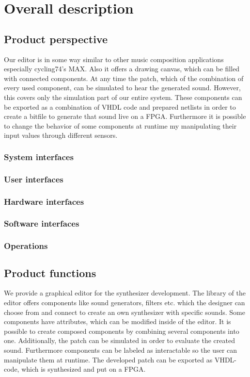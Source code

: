 \chapter{Overall description}
	\section{Product perspective}
	Our editor is in some way similar to other music composition applications especially cycling74's MAX. Also it offers a drawing canvas, which can be filled with connected components. At any time the patch, which of the combination of every used component, can be simulated to hear the generated sound. However, this covers only the simulation part of our entire system. These components can be exported as a combination of VHDL code and prepared netlists in order to create a bitfile to generate that sound live on a FPGA. Furthermore it is possible to change the behavior of some components at runtime my manipulating their input values through different sensors.
		\subsection{System interfaces}
		\subsection{User interfaces}
		\subsection{Hardware interfaces}
		\subsection{Software interfaces}
		\subsection{Operations}
	\section{Product functions}
	We provide a graphical editor for the synthesizer development. The library of the editor offers components like sound generators, filters etc. which the designer can choose from and connect to create an own synthesizer with specific sounds. Some components have attributes, which can be modified inside of the editor. It is possible to create composed components by combining several components into one. Additionally, the patch can be simulated in order to evaluate the created sound. Furthermore components can be labeled as interactable so the user can manipulate them at runtime. The developed patch can be exported as VHDL-code, which is synthesized and put on a FPGA.

